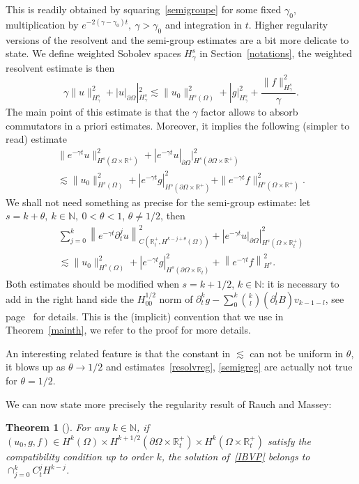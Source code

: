 \documentclass[10pt]{amsart}
\newtheorem{theo}{Theorem}[section]
\theoremstyle{definition}\newtheorem{defi}[theo]{Definition}\newtheorem{rema}[theo]{Remark}\newtheorem{exam}[theo]{Example}\newtheorem{exem}[theo]{Example}\newtheorem{nota}[theo]{Notation}
\newcommand{\R}{\mathbb{R}}
\newcommand{\N}{\mathbb{N}}
\begin{document}
This is readily obtained by squaring~\eqref{semigroupe} for some fixed $\gamma_0$, multiplication by $e^{-2(\gamma -\gamma_0)t},\
\gamma >\gamma_0$ and integration in $t$. Higher regularity versions of the resolvent and the semi-group estimates are a bit more delicate to state. We define weighted Sobolev spaces $H^s_\gamma$ in Section~\ref{notations}, the weighted resolvent estimate is then
\begin{equation}\label{resolvreg}
\gamma \|u\|_{H^s_\gamma}^2 +|u|_{\partial\Omega}|_{H^s_\gamma}^2
\lesssim \|u_0\|_{H^s(\Omega)}^2+ |g|_{H^s_\gamma}^2+\frac{
\|f\|_{H^s_\gamma}^2}{\gamma}.
\end{equation}
The main point of this estimate is that the $\gamma$ factor allows to absorb commutators in a priori estimates. Moreover, it implies the following (simpler to read) estimate
\begin{multline}\label{resolvreguseless}
\|e^{-\gamma t}u\|_{H^s(\Omega\times \R^+)}^2 +|e^{-\gamma t}u|_{\partial\Omega}|_{H^s(\partial\Omega\times \R^+)}^2
\\
\lesssim \|u_0\|_{H^s(\Omega)}^2+ |e^{-\gamma t}g|_{H^s(\partial\Omega\times \R^+)}^2+
\|e^{-\gamma t}f\|_{H^s(\Omega\times \R^+)}^2.
\end{multline}
We shall not need something as precise for the semi-group estimate: let $s=k+\theta,\ k\in \N,\ 0<\theta<1$, $\theta\neq 1/2$, then
\begin{multline}\label{semigreg}
\sum_{j=0}^k\left\|e^{-\gamma t}\partial_t^ju\right\|_{C\left(\R_t^+,H^{k-j+\theta}(\Omega)\right)}^2 +\left|e^{-\gamma t}u|_{\partial\Omega}\right|_{H^s\left(\Omega\times \R_t^+\right)}^2
\\
\lesssim \|u_0\|_{H^s(\Omega)}^2+ |e^{-\gamma t}g|_{H^s\left(\partial\Omega\times \R_t\right)}^2+
\left\|e^{-\gamma t}f\right\|_{H^s}^2.
\end{multline}
Both estimates should be modified when $s=k+1/2$, $k\in\N$: it is necessary to add in the right hand side the $H^{1/2}_{00}$ norm of $\partial_t^kg-\sum_0^k
\binom{k}{l}(\partial_t^lB)v_{k-1-l}$, see page~\pageref{cas1/2} for details. This is the (implicit) convention that we use in Theorem~\ref{mainth}, we refer to the proof for more details.

An interesting related feature is that the constant in $\lesssim$ can not be uniform in $\theta$, it blows up as $\theta \to 1/2$ and estimates~\eqref{resolvreg}, \eqref{semigreg} are actually not true for $\theta=1/2$.


We can now state more precisely the regularity result of Rauch and Massey:
\begin{theo}[\cite{RauchMassey}]
For any $k\in \N$, if $(u_0,g,f)\in H^k(\Omega)\times H^{k+1/2}(\partial \Omega\times \R_t^+)
\times H^k(\Omega\times \R_t^+)$ satisfy the compatibility condition up to order $k$, the solution of~\eqref{IBVP} belongs to $\cap_{j=0}^k C_t^jH^{k-j}$.
\end{theo}
\end{document}
